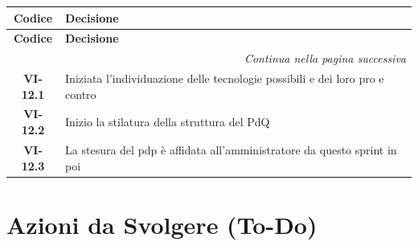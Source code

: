 \renewcommand{\arraystretch}{1.3}
\vspace{-0.3cm}
\noindent
\begin{longtable}{c p{12cm}}
	\toprule
	\textbf{Codice} & \textbf{Decisione} \\
	\midrule
	\endfirsthead

	\toprule
	\textbf{Codice} & \textbf{Decisione} \\
	\midrule
	\endhead

	\midrule
	\multicolumn{2}{r}{\textit{Continua nella pagina successiva}} \\
	\midrule
	\endfoot

	\bottomrule
	\endlastfoot

	\textbf{VI-12.1} & Iniziata l'individuazione delle tecnologie possibili e dei loro pro e contro \\[4pt]
	\textbf{VI-12.2} & Inizio la stilatura della struttura del PdQ\\[4pt]
	\textbf{VI-12.3} & La stesura del pdp è affidata all'amministratore da questo sprint in poi\\[4pt]
\end{longtable}

\section{Azioni da Svolgere (To-Do)}

